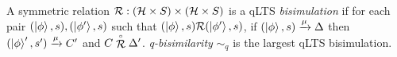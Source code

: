 
\begin{definition}
	A symmetric relation $\mathcal{R} : (\mathcal{H} \times S) \times (\mathcal{H} \times S)$ is a qLTS \emph{bisimulation} if for each pair $(\ket{\phi}, s), (\ket{\phi'}, s)$ such that $(\ket{\phi}, s) \mathcal{R} (\ket{\phi'}, s)$,
	if $(\ket{\phi}, s) \xrightarrow{\mu} \Delta$ then $(\ket{\phi}', s') \xrightarrow{\mu} C'$ and $C \stackrel{\scriptscriptstyle \circ}{\mathcal{R}} \Delta'$.
	\emph{q-bisimilarity} $\sim_q$ is the largest qLTS bisimulation.
\end{definition}
